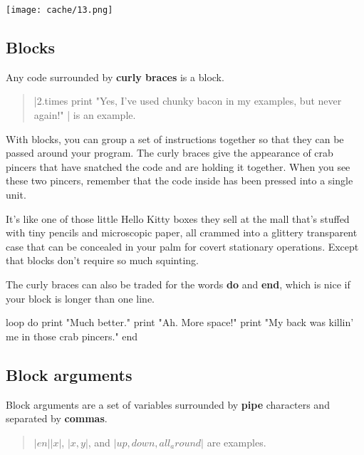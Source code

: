 \documentclass[12pt,twoside]{report}
\begin{document}
	\texttt{[image: cache/13.png]}




\subsection{Blocks}



Any code surrounded by {\bf curly braces} is a block.

\begin{quote}
\rubyinline|2.times { print "Yes, I've used chunky bacon in my examples, but never again!" }| is an example.\end{quote}


With blocks, you can group a set of instructions together so that they
can be passed around your program.  The curly braces give the
appearance of crab pincers that have snatched the code and are holding
it together.  When you see these two pincers, remember that the code
inside has been pressed into a single unit.

It's like one of those little Hello Kitty boxes they sell at the mall
that's stuffed with tiny pencils and microscopic paper, all crammed
into a glittery transparent case that can be concealed in your palm
for covert stationary operations.  Except that blocks don't require so
much squinting.

The curly braces can also be traded for the words {\bf do} and {\bf
  end}, which is nice if your block is longer than one line.

\begin{rubycode}

 loop do
   print "Much better."
   print "Ah.  More space!"
   print "My back was killin' me in those crab pincers."
 end

\end{rubycode}





\subsection{Block arguments}



Block arguments are a set of variables surrounded by {\bf pipe}
characters and separated by {\bf commas}.

\begin{quote}
\rubyinline$|en||x|$,
\rubyinline$|x,y|$, and
\rubyinline$|up, down, all_around|$ are
examples.\end{quote}
\end{document}
